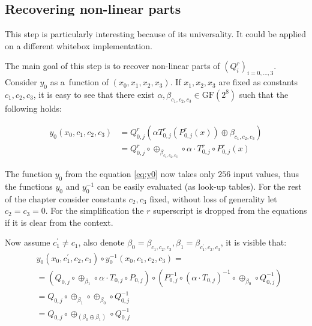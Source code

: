 \documentclass[11pt,oneside,final]{fithesis2}
\newcommand{\gfe}{\ensuremath{\text{GF}\left(2^8\right)}}
\begin{document}
    \subsection{Recovering non-linear parts}
    This step is particularly interesting because of its universality. It could be applied on a different whitebox implementation.
    
    The main goal of this step is to recover non-linear parts of $\left(Q^r_i\right)_{i=0,\dots,3}$. Consider $y_0$ as a~function of $\left(x_0, x_1, x_2, x_3\right)$.
    If $x_1, x_2, x_3$ are fixed as constants $c_1, c_2, c_3$, it is easy to see that there exist $\alpha, \beta_{c_1,c_2,c_3} \in \gfe$ such that the following holds:
    
    \begin{equation} \label{eq:y0}    
    \begin{aligned}
    y_0\left(x_0, c_1, c_2, c_3 \right) &= Q^r_{0,j} \left(\alpha T^r_{0,j}\left(P^r_{0,j}\left(x\right)\right) \oplus \beta_{c_1,c_2,c_3}\right) \\
				        &= Q^r_{0,j} \circ \oplus_{\beta_{c_1,c_2,c_3}} \circ \alpha \cdot T^r_{0,j} \circ P^r_{0,j} \left(x\right)
    \end{aligned}
    \end{equation}
    
    The function $y_0$ from the equation \ref{eq:y0} now takes only $256$ input values, thus the functions $y_0$ and $y_0^{-1}$ 
    can be easily evaluated (as look-up tables). For the rest of the chapter consider constants $c_2, c_3$ fixed, without loss 
    of generality let $c_2=c_3=0$. For the simplification the $r$ superscript is dropped from the 
    equations if it is clear from the context.

    Now assume $c^{\prime}_1 \neq c_1$, also denote $\beta_{0} = \beta_{c_1,c_2,c_3}, \beta_{1} = \beta_{c^{\prime}_1,c_2,c_3}$, it is visible that:
    \begin{subequations}
     \begin{align}
     & y_0\left(x_0, c^{\prime}_1, c_2, c_3 \right) \circ y_0^{-1}\left(x_0, c_1, c_2, c_3 \right) = \nonumber \\
     &=           \left( Q_{0,j}      \circ \oplus_{\beta_1}                         \circ \alpha \cdot T_{0,j}    \circ P_{0,j}     \right) \nonumber
	\circ     \left( P^{-1}_{0,j} \circ \left(\alpha \cdot T_{0,j}\right)^{-1}   \circ \oplus_{\beta_0}        \circ Q^{-1}_{0,j}\right) \nonumber \\
     &= Q_{0,j} \circ \oplus_{\beta_1} \circ \oplus_{\beta_0} \circ Q^{-1}_{0,j}                                                             \nonumber \\
     &= Q_{0,j} \circ \oplus_{\left(\beta_0 \oplus \beta_1\right)} \circ Q^{-1}_{0,j}                                                        \nonumber
     \end{align}
    \end{subequations}
\end{document}
